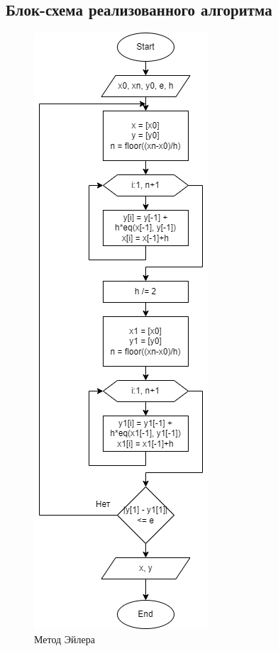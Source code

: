 \documentclass{article}
\begin{document}
      \subsection{Блок-схема реализованного алгоритма}
		\begin{figure}[H]
    		\centering
    		\includegraphics[scale=0.4]{euler.png}
    		\caption[Схема-1]{Метод Эйлера}
    		\label{fig:screenshot003}
    	\end{figure}
\end{document}
